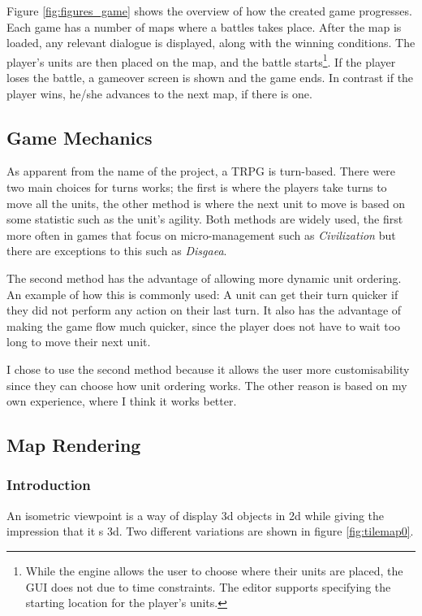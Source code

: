 Figure \ref{fig:figures_game} shows the overview of how the created game progresses.  Each game has a number of maps where a battles takes place. After the map is loaded, any relevant dialogue is displayed, along with the winning conditions. The player's units are then placed on the map, and the battle starts\footnote{While the engine allows the user to choose where their units are placed, the GUI does not due to time constraints. The editor supports specifying the starting location for the player's units.}. If the player loses the battle, a gameover screen is shown and the game ends. In contrast if the player wins, he/she advances to the next map, if there is one.    

\subsection{Game Mechanics}
As apparent from the name of the project, a TRPG is turn-based.  There were two main choices for turns works; the first is where the players take turns to move all the units, the other method is where the next unit to move is based on some statistic such as the unit's agility. Both methods are widely used,  the first more often in games that focus on micro-management such as \emph{Civilization} but there are exceptions to this such as \emph{Disgaea}. 

The second method has the advantage of allowing more dynamic unit ordering.  An example of how this is commonly used: A unit can get their turn quicker if they did not perform any action on their last turn. It also has the advantage of making the game flow much quicker, since the player does not have to wait too long to move their next unit. 

I chose to use the second method because it allows the user more customisability since they can choose how unit ordering works. The other reason is based on my own experience, where I think it works better.

\subsection{Map Rendering}

\subsubsection{Introduction}
An isometric viewpoint is a way of display 3d objects in 2d while giving the impression that it s 3d.  Two different variations are shown in figure \ref{fig:tilemap0}.  

